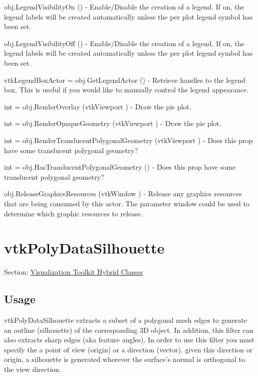 \begin{DoxyItemize}
\item {\ttfamily obj.\-Legend\-Visibility\-On ()} -\/ Enable/\-Disable the creation of a legend. If on, the legend labels will be created automatically unless the per plot legend symbol has been set.  
\item {\ttfamily obj.\-Legend\-Visibility\-Off ()} -\/ Enable/\-Disable the creation of a legend. If on, the legend labels will be created automatically unless the per plot legend symbol has been set.  
\item {\ttfamily vtk\-Legend\-Box\-Actor = obj.\-Get\-Legend\-Actor ()} -\/ Retrieve handles to the legend box. This is useful if you would like to manually control the legend appearance.  
\item {\ttfamily int = obj.\-Render\-Overlay (vtk\-Viewport )} -\/ Draw the pie plot.  
\item {\ttfamily int = obj.\-Render\-Opaque\-Geometry (vtk\-Viewport )} -\/ Draw the pie plot.  
\item {\ttfamily int = obj.\-Render\-Translucent\-Polygonal\-Geometry (vtk\-Viewport )} -\/ Does this prop have some translucent polygonal geometry?  
\item {\ttfamily int = obj.\-Has\-Translucent\-Polygonal\-Geometry ()} -\/ Does this prop have some translucent polygonal geometry?  
\item {\ttfamily obj.\-Release\-Graphics\-Resources (vtk\-Window )} -\/ Release any graphics resources that are being consumed by this actor. The parameter window could be used to determine which graphic resources to release.  
\end{DoxyItemize}\hypertarget{vtkhybrid_vtkpolydatasilhouette}{}\section{vtk\-Poly\-Data\-Silhouette}\label{vtkhybrid_vtkpolydatasilhouette}
Section\-: \hyperlink{sec_vtkhybrid}{Visualization Toolkit Hybrid Classes} \hypertarget{vtkwidgets_vtkxyplotwidget_Usage}{}\subsection{Usage}\label{vtkwidgets_vtkxyplotwidget_Usage}
vtk\-Poly\-Data\-Silhouette extracts a subset of a polygonal mesh edges to generate an outline (silhouette) of the corresponding 3\-D object. In addition, this filter can also extracts sharp edges (aka feature angles). In order to use this filter you must specify the a point of view (origin) or a direction (vector). given this direction or origin, a silhouette is generated wherever the surface's normal is orthogonal to the view direction.

